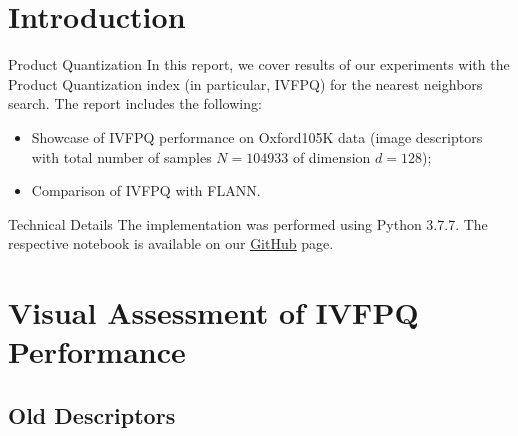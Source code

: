 \section{Introduction}

\begin{frame}
	\begin{block}{Product Quantization}
		In this report, we cover results of our experiments with the Product Quantization index (in particular, IVFPQ\footnotemark) \cite{Jegou2011} for the nearest neighbors search. The report includes the following:
		\begin{itemize}
			\item Showcase of IVFPQ performance on Oxford105K data (image descriptors with total number of samples $N = 104933$ of dimension $d = 128$);
			\item Comparison of IVFPQ with FLANN\footnotemark \cite{Muja2009}.
		\end{itemize}
	\end{block}
	
	\begin{block}{Technical Details}
		The implementation was performed using Python 3.7.7. The respective notebook is available on our \href{https://github.com/salisaresama/computer-vision/blob/master/product_quantization.ipynb}{{\color{blue}\underline{GitHub}}} page.
	\end{block}
	
	\addtocounter{footnote}{-2}
\end{frame}


\section{Visual Assessment of IVFPQ Performance}
\subsection{Old Descriptors}

